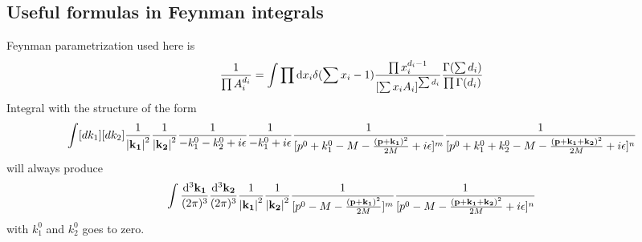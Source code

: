 \documentclass{article}
\begin{document}
\begin{appendices}
  \section{Useful formulas in Feynman integrals}
  Feynman parametrization used here is
  \begin{align}
	\frac{1}{\prod A_i^{d_i}}=\int\prod \dd x_i \delta(\sum x_i-1)\frac{\prod x_i^{d_i-1}}{\bqty{\sum x_iA_i}^{\sum d_i}}\frac{\Gamma(\sum d_i)}{\prod\Gamma(d_i)}
	\label{FEYNMANPARA}
  \end{align}
  Integral with the structure of the form 
  \begin{align*}
	\int[dk_1][dk_2]\frac{1}{\vb{\abs{k_1}}^2}\frac{1}{\vb{\abs{k_2}}^2}\frac{1}{-k_1^0-k_2^0+i\epsilon}\frac{1}{-k_1^0+i\epsilon}\frac{1}{[p^0+k_1^0-M-\frac{\vb{(p+k_1)}^2}{2M}+i\epsilon]^m}\frac{1}{[p^0+k_1^0+k_2^0-M-\frac{\vb{(p+k_1+k_2)}^2}{2M}+i\epsilon]^n}
  \end{align*}
  will always produce
  \begin{align*}
	\int\frac{\dd^3\vb{k_1}}{(2\pi)^3}\frac{\dd^3\vb{k_2}}{(2\pi)^3}\frac{1}{\vb{\abs{k_1}}^2}\frac{1}{\vb{\abs{k_2}}^2}\frac{1}{[p^0-M-\frac{\vb{(p+k_1)}^2}{2M}]^m}\frac{1}{[p^0-M-\frac{\vb{(p+k_1+k_2)}^2}{2M}+i\epsilon]^n}
  \end{align*}
  with $k_1^0$ and $k_2^0$ goes to zero.


\end{appendices}
\end{document}
